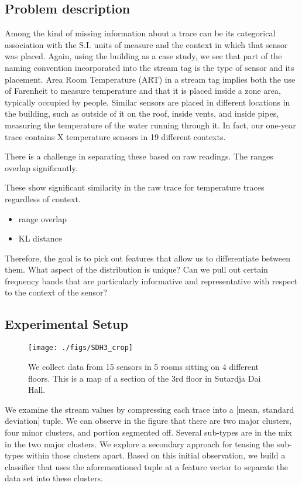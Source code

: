 
\subsection{Problem description}
Among the kind of missing information about a trace can be its categorical association with the S.I. units of measure
and the context in which that sensor was placed.  Again, using the building as a case study, we see that part of the 
naming convention incorporated into the stream tag is the type of sensor and its placement.  Area Room Temperature (ART)
in a stream tag implies both the use of Farenheit to measure temperature and that it is placed inside a zone area,
typically occupied by people.  Similar sensors are placed in different locations in the building, such as outside of it
on the roof, inside vents, and inside pipes, measuring the temperature of the water running through it.  In fact, our
one-year trace contains X temperature sensors in 19 different contexts.

There is a challenge in separating these based on raw readings.  The ranges overlap significantly.

These show significant similarity in the raw trace for temperature traces regardless of context.
\begin{itemize}
\item range overlap
\item KL distance
\end{itemize}

Therefore, the goal is to pick out features that allow us to differentiate between them.  What aspect of the distribution is unique?
Can we pull out certain frequency bands that are particularly informative and representative with respect to the context of
the sensor?

\subsection{Experimental Setup}
\begin{figure}[h!]
\centering
  \texttt{[image: ./figs/SDH3\_crop]}
\caption{We collect data from 15 sensors in 5 rooms sitting on 4 different floors. This is a map of a section of the 3rd floor
in Sutardja Dai Hall.}
\label{fig:sdh}
\end{figure}

We examine the stream values by compressing each trace into a [mean, standard deviation] tuple.  We can observe in the figure that there 
are two major clusters, four minor clusters, and portion segmented off.  Several sub-types are in the mix in the two major clusters.
We explore a secondary approach for teasing the sub-types within those clusters apart.  Based on this initial observation, we build a
classifier that uses the aforementioned tuple at a feature vector to separate the data set into these clusters.

